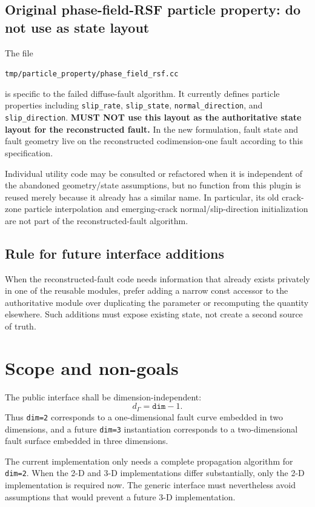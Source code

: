 \documentclass[11pt]{article}
\newcommand{\faultdim}{d_\Gamma}
\begin{document}
\subsection{Original phase-field-RSF particle property: do not use as state layout}
The file
\begin{center}
\texttt{tmp/particle\_property/phase\_field\_rsf.cc}
\end{center}
is specific to the failed diffuse-fault algorithm.  It currently defines particle properties including \texttt{slip\_rate}, \texttt{slip\_state}, \texttt{normal\_direction}, and \texttt{slip\_direction}.  \textbf{MUST NOT use this layout as the authoritative state layout for the reconstructed fault.}  In the new formulation, fault state and fault geometry live on the reconstructed codimension-one fault according to this specification.

Individual utility code may be consulted or refactored when it is independent of the abandoned geometry/state assumptions, but no function from this plugin is reused merely because it already has a similar name.  In particular, its old crack-zone particle interpolation and emerging-crack normal/slip-direction initialization are not part of the reconstructed-fault algorithm.

\subsection{Rule for future interface additions}
When the reconstructed-fault code needs information that already exists privately in one of the reusable modules, prefer adding a narrow const accessor to the authoritative module over duplicating the parameter or recomputing the quantity elsewhere.  Such additions must expose existing state, not create a second source of truth.

\section{Scope and non-goals}

The public interface shall be dimension-independent:
\[
\faultdim = \texttt{dim}-1.
\]
Thus \texttt{dim=2} corresponds to a one-dimensional fault curve embedded in two dimensions, and a future \texttt{dim=3} instantiation corresponds to a two-dimensional fault surface embedded in three dimensions.

The current implementation only needs a complete propagation algorithm for \texttt{dim=2}.  When the 2-D and 3-D implementations differ substantially, only the 2-D implementation is required now.  The generic interface must nevertheless avoid assumptions that would prevent a future 3-D implementation.
\end{document}

